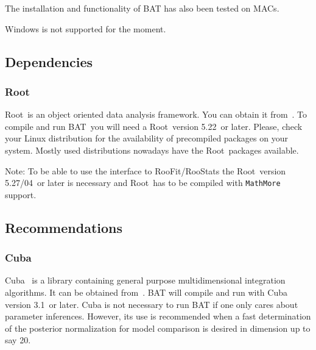 \documentclass[11pt, a4paper]{article}
\newcommand{\bat}{{\sc BAT}}
\newcommand{\Root}{{\sc Root}}
\newcommand{\RootVersion}{5.22}
\newcommand{\RooStatsVersion}{5.27/04}
\newcommand{\CubaVersion}{3.1}
\begin{document}
The installation and functionality of BAT has also been tested on MACs.

Windows is not supported for the moment.


\subsection{Dependencies}
\subsubsection{\Root}
\Root\ is an object oriented data analysis framework. You can obtain it
from~\cite{ROOTweb}. To compile and run \bat\ you will need a \Root\
version \RootVersion\ or later. Please, check your Linux distribution for the
availability of precompiled packages on your system. Mostly used
distributions nowadays have the \Root\ packages available.

Note: To be able to use the interface to RooFit/RooStats the \Root\
version \RooStatsVersion\ or later is necessary and \Root\ has to be compiled
with \verb|MathMore| support.


\subsection{Recommendations}
\addtocontents{toc}{\protect\setcounter{tocdepth}{2}}
\subsubsection{Cuba}
\addtocontents{toc}{\protect\setcounter{tocdepth}{3}} Cuba~\cite{CUBA}
is a library containing general purpose multidimensional integration
algorithms. It can be obtained from~\cite{CUBAweb}. BAT will compile
and run with Cuba version \CubaVersion\ or later. Cuba is not
necessary to run BAT if one only cares about parameter
inferences. However, its use is recommended when a fast determination
of the posterior normalization for model comparison is desired in
dimension up to say 20.
\end{document}
